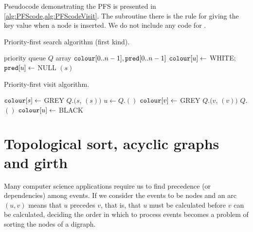 Pseudocode demonstrating the PFS is presented in \cref{alg:PFScode,alg:PFScodeVisit}. 
The subroutine  there is the rule for giving the key value when a node is inserted. 
We do not include any code for .

\begin{algorithm}[H]
  \caption{Priority-first search algorithm (first kind).}
  \label{alg:PFScode}
\begin{algorithmic}[1]
	\State priority queue $Q$  
	\State array $\colour[0..n-1], \pred[0..n-1]$
		\State $\colour[u] \gets $ WHITE; $\pred[u] \gets $ NULL
	\EndFor
			\State {}$(s)$
		\EndIf
	\EndFor
	\State \Return{$\pred$}
\EndFunction
\end{algorithmic}
\end{algorithm}

\begin{algorithm}[H]
  \caption{Priority-first visit algorithm.}
  \label{alg:PFScodeVisit}
  \begin{algorithmic}[1]
	\State $\colour[s] \gets $ GREY 
	\State $Q$.$(s$, $(s))$
		\State $u \gets Q$.$()$
			\State $\colour[v] \gets $ GREY
			\State $Q$.$(v$, $(v))$
		\Else
			\State $Q$.$()$
			\State $\colour[u] \gets$ BLACK
		\EndIf
	\EndWhile
\EndFunction
\end{algorithmic}
\end{algorithm}



\chapter{Topological sort, acyclic graphs and girth} %

Many computer science applications require us to find precedence (or dependencies) among events. 
If we consider the events to be nodes and an arc $(u,v)$ means that $u$ precedes $v$, that is, 
that $u$ must be calculated before $v$ can be calculated, 
deciding the order in which to process events becomes a problem of sorting the nodes of a digraph.


